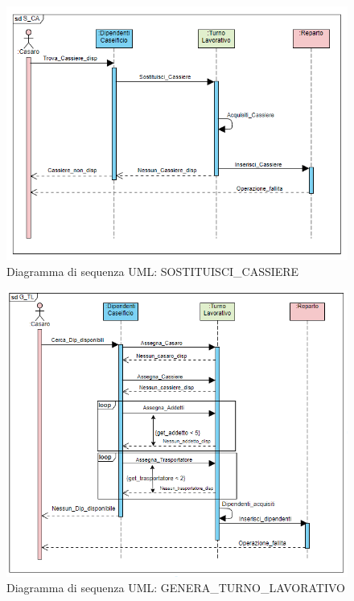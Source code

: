 \documentclass[12pt]{report}
\begin{document}
\begin{figure}[H]
\centering
\includegraphics[scale=0.85]{imgs/UML/sdS_CA.PNG}
\caption{Diagramma di sequenza UML: SOSTITUISCI\_CASSIERE}
\end{figure}

\begin{figure}[H]
\centering
\includegraphics[scale=1]{imgs/UML/sdG_TL.PNG}
\caption{Diagramma di sequenza UML: GENERA\_TURNO\_LAVORATIVO}
\end{figure}
\end{document}
